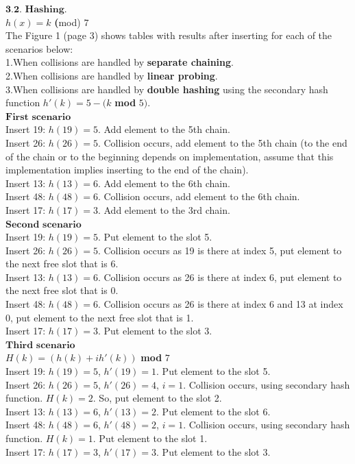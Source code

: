\documentclass[11pt]{article}
\begin{document}
\bigbreak
\noindent $\textbf{3.2. Hashing}$.\\
$h(x)=k$ \textbf(mod) $7$\\
The Figure 1 (page 3) shows tables with results after inserting for each of the scenarios below:\\
\noindent 1.When collisions are handled by \textbf{separate chaining}.\\
\noindent 2.When collisions are handled by \textbf{linear probing}.\\
\noindent 3.When collisions are handled by \textbf{double hashing} using the secondary
hash function $ h'(k)=5 - (k$ \textbf{mod} $5)$.\\

\noindent$\textbf{First scenario}$\\
Insert 19: $h(19)=5$. Add element to the 5th chain.\\
Insert 26: $h(26)=5$. Collision occurs, add element to the 5th chain (to the end of the chain or to the beginning depends on implementation, assume that this implementation implies inserting to the end of the chain).\\
Insert 13: $h(13)=6$. Add element to the 6th chain.\\
Insert 48: $h(48)=6$. Collision occurs, add element to the 6th chain.\\
Insert 17: $h(17)=3$. Add element to the 3rd chain.\\

\noindent$\textbf{Second scenario}$\\
Insert 19: $h(19)=5$. Put element to the slot 5.\\
Insert 26: $h(26)=5$. Collision occurs as 19 is there at index 5, put element to the next free slot that is 6.\\
Insert 13: $h(13)=6$. Collision occurs as 26 is there at index 6, put element to the next free slot that is 0.\\
Insert 48: $h(48)=6$. Collision occurs as 26 is there at index 6 and 13 at index 0, put element to the next free slot that is 1.\\
Insert 17: $h(17)=3$. Put element to the slot 3.\\

\noindent$\textbf{Third scenario}$\\
$H(k) =(h(k)+ih'(k))$ \textbf{mod} $7$\\
Insert 19: $h(19)=5$, $h'(19)=1$. Put element to the slot 5.\\
Insert 26: $h(26)=5$, $h'(26)=4$, $i=1$. Collision occurs, using secondary hash function. $H(k)=2$. So, put element to the slot 2.\\
Insert 13: $h(13)=6$, $h'(13)=2$. Put element to the slot 6.\\
Insert 48: $h(48)=6$, $h'(48)=2$, $i=1$. Collision occurs, using secondary hash function. $H(k)=1$. Put element to the slot 1.\\
Insert 17: $h(17)=3$, $h'(17)=3$. Put element to the slot 3.\\
\end{document}
